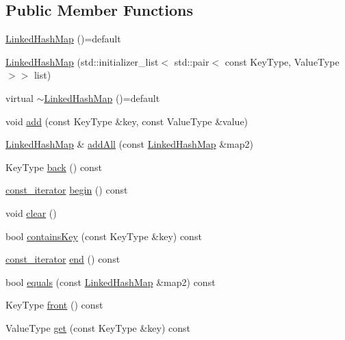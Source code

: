 \subsection*{Public Member Functions}
\begin{DoxyCompactItemize}
\item 
\mbox{\hyperlink{classLinkedHashMap_a9b6d44aae08255348425c16378961467}{Linked\+Hash\+Map}} ()=default
\item 
\mbox{\hyperlink{classLinkedHashMap_a331f6cf326ea84040c60398eff855a99}{Linked\+Hash\+Map}} (std\+::initializer\+\_\+list$<$ std\+::pair$<$ const Key\+Type, Value\+Type $>$$>$ list)
\item 
virtual \mbox{\hyperlink{classLinkedHashMap_ab49c89d64a3b626757dd3c6150c02df9}{$\sim$\+Linked\+Hash\+Map}} ()=default
\item 
void \mbox{\hyperlink{classLinkedHashMap_a9129d6095063e7e14d85c627d35086a5}{add}} (const Key\+Type \&key, const Value\+Type \&value)
\item 
\mbox{\hyperlink{classLinkedHashMap}{Linked\+Hash\+Map}} \& \mbox{\hyperlink{classLinkedHashMap_a9e6cd6e8273810ac99a612cdf14f084c}{add\+All}} (const \mbox{\hyperlink{classLinkedHashMap}{Linked\+Hash\+Map}} \&map2)
\item 
Key\+Type \mbox{\hyperlink{classLinkedHashMap_adfa4b8f8e4f5ecc11fb76a3efba70d70}{back}} () const
\item 
\mbox{\hyperlink{classLinkedHashMap_a40260d13231ddfc81d864ded4ad05c45}{const\+\_\+iterator}} \mbox{\hyperlink{classLinkedHashMap_a29305669b60ca1680752e2fc3592ba99}{begin}} () const
\item 
void \mbox{\hyperlink{classLinkedHashMap_ac8bb3912a3ce86b15842e79d0b421204}{clear}} ()
\item 
bool \mbox{\hyperlink{classLinkedHashMap_a37473445b6725c5f0fc59a32ea2e645e}{contains\+Key}} (const Key\+Type \&key) const
\item 
\mbox{\hyperlink{classLinkedHashMap_a40260d13231ddfc81d864ded4ad05c45}{const\+\_\+iterator}} \mbox{\hyperlink{classLinkedHashMap_accf9a4bd0c34d4a5f6a7dab66ea10cdc}{end}} () const
\item 
bool \mbox{\hyperlink{classLinkedHashMap_ad02a403a51be973f5e44812f9b7d897a}{equals}} (const \mbox{\hyperlink{classLinkedHashMap}{Linked\+Hash\+Map}} \&map2) const
\item 
Key\+Type \mbox{\hyperlink{classLinkedHashMap_a6e76878901fa73e176909ac015834f1a}{front}} () const
\item 
Value\+Type \mbox{\hyperlink{classLinkedHashMap_a3ac97b0a9a7fa131221427f628667ae9}{get}} (const Key\+Type \&key) const
$$
\end{DoxyCompactItemize}
